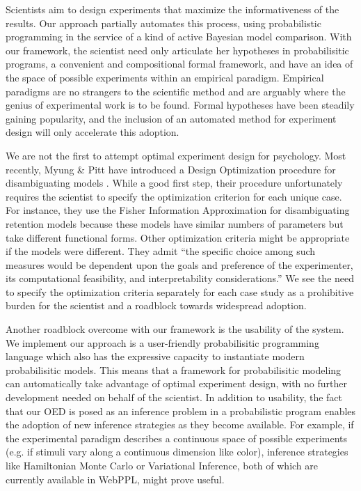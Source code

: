 \documentclass{article}
\newcommand{\lou}[1]{\textcolor{orange}{[lou: #1]}}
\begin{document}
%



Scientists aim to design experiments that maximize the informativeness of the results.
Our approach partially automates this process, using probabilistic programming in the service of a kind of active Bayesian model comparison.
With our framework, the scientist need only articulate her hypotheses in probabilisitic programs, a convenient and compositional formal framework, and have an idea of the space of possible experiments within an empirical paradigm.
Empirical paradigms are no strangers to the scientific method and are arguably where the genius of experimental work is to be found.
Formal hypotheses have been steadily gaining popularity, and the inclusion of an automated method for experiment design will only accelerate this adoption.

We are not the first to attempt optimal experiment design for psychology.
Most recently, Myung \& Pitt have introduced a Design Optimization procedure for disambiguating models \cite{Myung2009}.
While a good first step, their procedure unfortunately requires the scientist to specify the optimization criterion for each unique case. For instance, they use the Fisher Information Approximation for disambiguating retention models because these models have similar numbers of parameters but take different functional forms. Other optimization criteria might be appropriate if the models were different. They admit ``the specific choice among such measures would be dependent upon the goals and preference of the experimenter, its computational feasibility, and interpretability considerations.''
We see the need to specify the optimization criteria separately for each case study as a prohibitive burden for the scientist and a roadblock towards widespread adoption.

Another roadblock overcome with our framework is the usability of the system.
We implement our approach is a user-friendly probabilisitic programming language which also has the expressive capacity to instantiate modern probabilisitic models.
This means that a framework for probabilisitic modeling can automatically take advantage of optimal experiment design, with no further development needed on behalf of the scientist.
In addition to usability, the fact that our OED is posed as an inference problem in a probabilistic program enables the adoption of new inference strategies as they become available.
For example, if the experimental paradigm describes a continuous space of possible experiments (e.g. if stimuli vary along a continuous dimension like color), inference strategies like Hamiltonian Monte Carlo or Variational Inference, both of which are currently available in WebPPL, might prove useful.
\end{document}
